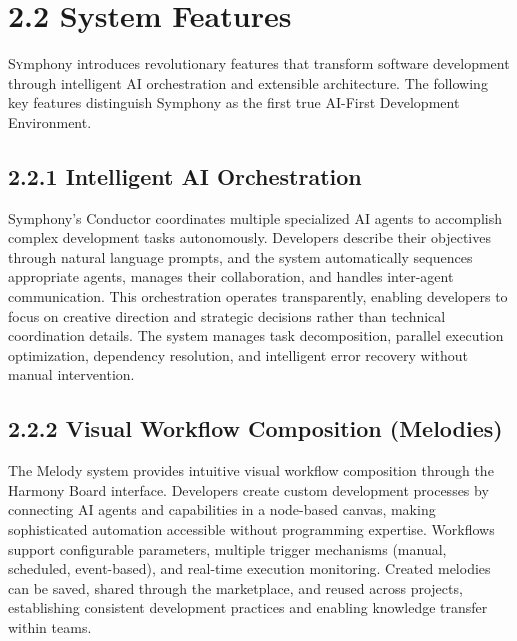 
\clearpage
\section{2.2 System Features}
\label{sec:features}

\lettrine{S}ymphony introduces revolutionary features that transform software development through intelligent AI orchestration and extensible architecture. The following key features distinguish Symphony as the first true AI-First Development Environment.

\subsection*{2.2.1 Intelligent AI Orchestration}

Symphony's Conductor coordinates multiple specialized AI agents to accomplish complex development tasks autonomously. Developers describe their objectives through natural language prompts, and the system automatically sequences appropriate agents, manages their collaboration, and handles inter-agent communication. This orchestration operates transparently, enabling developers to focus on creative direction and strategic decisions rather than technical coordination details. The system manages task decomposition, parallel execution optimization, dependency resolution, and intelligent error recovery without manual intervention.

\subsection*{2.2.2 Visual Workflow Composition (Melodies)}

The Melody system provides intuitive visual workflow composition through the Harmony Board interface. Developers create custom development processes by connecting AI agents and capabilities in a node-based canvas, making sophisticated automation accessible without programming expertise. Workflows support configurable parameters, multiple trigger mechanisms (manual, scheduled, event-based), and real-time execution monitoring. Created melodies can be saved, shared through the marketplace, and reused across projects, establishing consistent development practices and enabling knowledge transfer within teams.


